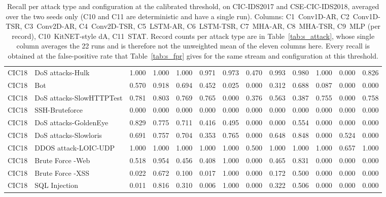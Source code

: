 \begin{table}[ht]
\begin{tabular}{llrrrrrrrrrrr}
CIC18 & DoS attacks-Hulk & 1.000 & 1.000 & 1.000 & 0.971 & 0.973 & 0.470 & 0.993 & 0.980 & 1.000 & 0.000 & 0.826\\
CIC18 & Bot & 0.570 & 0.918 & 0.694 & 0.452 & 0.025 & 0.000 & 0.312 & 0.688 & 0.087 & 0.000 & 0.000\\
CIC18 & DoS attacks-SlowHTTPTest & 0.781 & 0.803 & 0.769 & 0.765 & 0.000 & 0.376 & 0.563 & 0.387 & 0.755 & 0.000 & 0.758\\
CIC18 & SSH-Bruteforce & 0.000 & 0.000 & 0.000 & 0.000 & 0.000 & 0.000 & 0.000 & 0.000 & 0.000 & 0.000 & 0.000\\
CIC18 & DoS attacks-GoldenEye & 0.829 & 0.775 & 0.711 & 0.416 & 0.495 & 0.000 & 0.000 & 0.554 & 0.000 & 0.000 & 0.000\\
CIC18 & DoS attacks-Slowloris & 0.691 & 0.757 & 0.704 & 0.353 & 0.765 & 0.000 & 0.648 & 0.848 & 0.000 & 0.524 & 0.000\\
CIC18 & DDOS attack-LOIC-UDP & 1.000 & 1.000 & 1.000 & 1.000 & 1.000 & 0.500 & 1.000 & 1.000 & 1.000 & 0.657 & 1.000\\
CIC18 & Brute Force -Web & 0.518 & 0.954 & 0.456 & 0.408 & 1.000 & 0.000 & 0.465 & 0.831 & 0.000 & 0.000 & 0.000\\
CIC18 & Brute Force -XSS & 0.022 & 0.672 & 0.100 & 0.017 & 1.000 & 0.000 & 0.172 & 0.500 & 0.000 & 0.000 & 0.000\\
CIC18 & SQL Injection & 0.011 & 0.816 & 0.310 & 0.006 & 1.000 & 0.000 & 0.322 & 0.506 & 0.000 & 0.000 & 0.000\\
\hline
\end{tabular}
\caption{Recall per attack type and configuration at the calibrated threshold, on CIC-IDS2017 and CSE-CIC-IDS2018, averaged over the two seeds only (C10 and C11 are deterministic and have a single run). Columns: C1~Conv1D-AR, C2~Conv1D-TSR, C3~Conv2D-AR, C4~Conv2D-TSR, C5~LSTM-AR, C6~LSTM-TSR, C7~MHA-AR, C8~MHA-TSR, C9~MLP (per record), C10~KitNET-style dA, C11~STAT. Record counts per attack type are in Table~\ref{tab:s_attack}, whose single column averages the 22 runs and is therefore not the unweighted mean of the eleven columns here. Every recall is obtained at the false-positive rate that Table~\ref{tab:s_fpr} gives for the same stream and configuration at this threshold.}\label{tab:s_attack_cfg_b}
\end{table}

